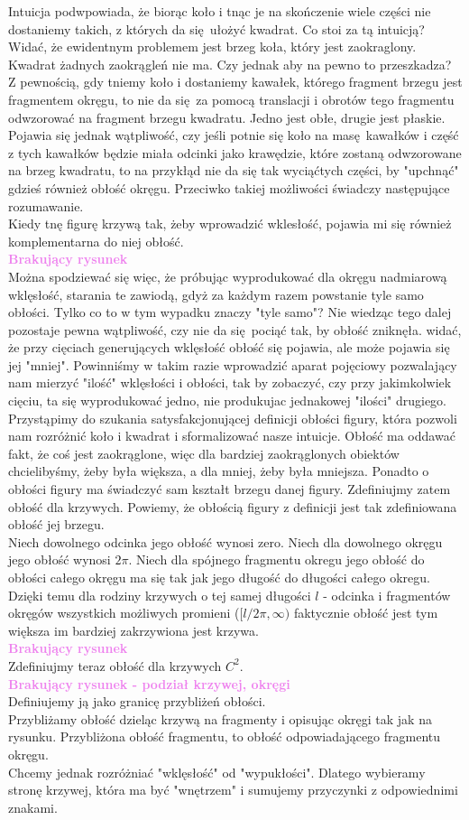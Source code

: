 \documentclass[a4paper, 12pt]{article}
\newcommand{\rysunek}[1]{\hfill \break\\[16pt] \Huge \textbf{\textcolor{violet}{Brakujący rysunek \normalsize
#1}} \hfill
\break \\[16pt] \normalsize}
\begin{document}
Intuicja podwpowiada, że biorąc koło i tnąc je na skończenie wiele części nie dostaniemy takich, z których
da się ułożyć kwadrat. Co stoi za tą intuicją? Widać, że ewidentnym problemem jest brzeg koła, który jest
zaokraglony. Kwadrat żadnych zaokrągleń nie ma. Czy jednak aby na pewno to przeszkadza? Z pewnością, gdy
tniemy koło i dostaniemy kawałek, którego fragment brzegu jest fragmentem okręgu, to nie da się za pomocą
translacji i obrotów tego fragmentu odwzorować na fragment brzegu kwadratu. Jedno jest obłe, drugie jest
płaskie. Pojawia się jednak wątpliwość, czy jeśli potnie się koło na masę kawałków i część z tych kawałków
będzie miała odcinki jako krawędzie, które zostaną odwzorowane na brzeg kwadratu, to na przykłąd nie da się
tak wyciąćtych części, by "upchnąć" gdzieś również obłość okręgu. Przeciwko takiej możliwości świadczy
następujące rozumawanie. \\
Kiedy tnę figurę krzywą tak, żeby wprowadzić wklesłość, pojawia mi się również komplementarna do niej obłość.
\rysunek{}
Można spodziewać się więc, że próbując wyprodukować dla okręgu nadmiarową wklęsłość, starania te zawiodą,
gdyż za każdym razem powstanie tyle samo obłości. Tylko co to w tym wypadku znaczy "tyle samo"?
Nie wiedząc tego dalej pozostaje pewna wątpliwość, czy nie da się pociąć tak, by obłość zniknęła. widać, że
przy cięciach generujących wklęsłość obłość się pojawia, ale może pojawia się jej "mniej". Powinniśmy w takim
razie wprowadzić aparat pojęciowy pozwalający nam mierzyć "ilość" wklęsłości i obłości, tak by zobaczyć, czy
przy jakimkolwiek cięciu, ta się wyprodukować jedno, nie produkujac jednakowej "ilości" drugiego. \\[4pt]
Przystąpimy do szukania satysfakcjonującej definicji obłości figury, która pozwoli nam rozróżnić
koło i kwadrat i sformalizować nasze intuicje. Obłość ma oddawać fakt, że coś jest zaokrąglone, więc dla bardziej
zaokrąglonych obiektów chcielibyśmy, żeby była większa, a dla mniej, żeby była mniejsza. Ponadto o obłości
figury ma świadczyć sam kształt brzegu danej figury. Zdefiniujmy zatem obłość dla krzywych. Powiemy, że
obłością figury z definicji jest tak zdefiniowana obłość jej brzegu. \\
Niech dowolnego odcinka jego obłość wynosi zero. Niech dla dowolnego okręgu jego obłość wynosi $2\pi$.
Niech dla spójnego fragmentu okregu jego obłość do obłości całego okręgu ma się tak jak jego długość do
długości całego okregu. Dzięki temu dla rodziny krzywych o tej samej długości $l$ - odcinka i fragmentów
okręgów wszystkich możliwych promieni ($[l/2\pi, \infty)$ faktycznie obłość jest tym większa im bardziej
zakrzywiona jest krzywa.
\rysunek{}
Zdefiniujmy teraz obłość dla krzywych $C^2$.
\rysunek{ - podział krzywej, okręgi }
Definiujemy ją jako granicę przybliżeń obłości. \\
Przybliżamy obłość dzieląc krzywą na fragmenty i opisując okręgi tak jak na rysunku. Przybliżona obłość
fragmentu, to obłość odpowiadającego fragmentu okręgu. \\
Chcemy jednak rozróżniać "wklęsłość" od "wypukłości". Dlatego wybieramy stronę krzywej, która ma być
"wnętrzem" i sumujemy przyczynki z odpowiednimi znakami. \\
\end{document}
